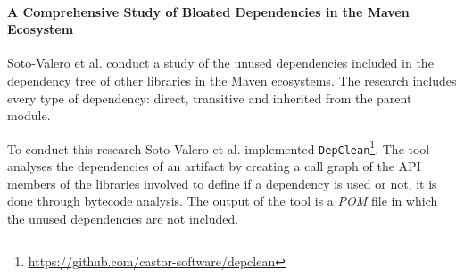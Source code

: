 \begin{comment}
\paragraph{Vulnerable Open Source Dependencies: Counting Those That Matter \cite{pashchenko2018vulnerable}} %
In this research, Pashchenko et al. propose a new method to count the dependencies of libraries. This method is used to analyse the dependencies of 200 libraries of the Maven ecosystem. With their method, they differentiate between libraries from the same project and third-party libraries. Furthermore, the dependencies that are not deployed in production (only used for testing or development purposes) are filtered out, since the vulnerabilities of this dependencies do not affect the final product. Furthermore, they consider the special case of halted dependencies, which are the ones that are not being actively developed. Vulnerabilities in halted dependencies suppose an important threat to the software project that depend on these, since the vulnerability is not going to be fixed.

One of the main contributions of this research is a tool implementing the method defined in the paper to detect the vulnerabilities that, according to their definition, matter.

However, Pashchenko et al. do not perform a call-level analysis of the dependencies, since their dependency resolution is based only on the \textit{POM} file of the libraries. Hence, the transitive dependencies that are not really used in the studied library are still counted.
\end{comment}

\paragraph{A Comprehensive Study of Bloated Dependencies in the Maven Ecosystem \cite{soto2020comprehensive}}
Soto-Valero et al. conduct a study of the unused dependencies included in the dependency tree of other libraries in the Maven ecosystems. The research includes every type of dependency: direct, transitive and inherited from the parent module.

To conduct this research Soto-Valero et al. implemented \texttt{DepClean}\footnote{\href{https://github.com/castor-software/depclean}{https://github.com/castor-software/depclean}}. The tool analyses the dependencies of an artifact by creating a call graph of the API members of the libraries involved to define if a dependency is used or not, it is done through bytecode analysis. The output of the tool is a \textit{POM} file in which the unused dependencies are not included.

